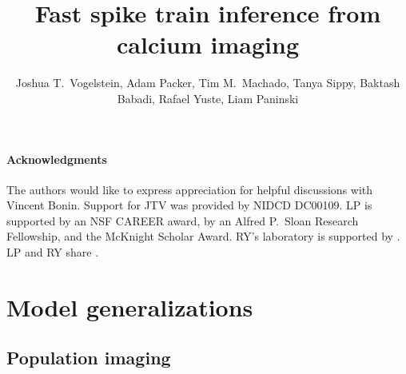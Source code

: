  
\usepackage{multicol}
\usepackage{hyperref}
\newcommand{\zzz}{z}
\newcommand{\az}{\argmin_{\bM \bC \geq \ve{0}}}
\newcommand{\anx}{\argmax_{n_t \in \mathbb{N}_0 \forall t}}
\newcommand{\ann}{\argmin_{n_t \in \mathbb{N}_0 \forall t}}
\newcommand{\foopsi}{fast }


\title{Fast spike train inference from calcium imaging}

\author{Joshua T.~Vogelstein, Adam Packer, Tim M.~Machado, Tanya Sippy, Baktash Babadi, Rafael Yuste, Liam Paninski}



\maketitle
\tableofcontents
 









\paragraph{Acknowledgments}

The authors would like to express appreciation for helpful discussions with Vincent Bonin.  Support for JTV was provided by NIDCD DC00109. LP is supported by an NSF CAREER award, by an Alfred P.\ Sloan Research Fellowship, and the McKnight Scholar Award. RY's laboratory is supported by .  LP and RY share .


%
%

%


\appendix


\section{Model generalizations} \label{sec:model2}


\clearpage\newpage
\subsection{Population imaging} \label{sec:pop}


